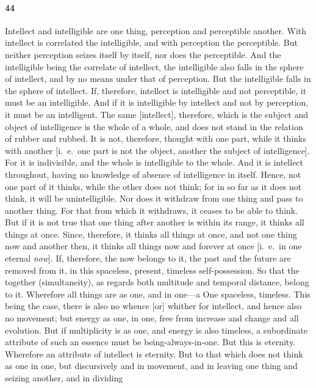 \documentclass[12pt]{article}
\begin{document}
\paragraph{44} Intellect and intelligible are one thing, perception and
perceptible another. With intellect is correlated the intelligible, and with
perception the perceptible. But neither perception seizes itself by itself, nor
does the perceptible. And the intelligible being the correlate of intellect,
the intelligible also falls in the sphere of intellect, and by no means under
that of perception. But the intelligible falls in the sphere of intellect. If,
therefore, intellect is intelligible and not perceptible, it must be an
intelligible. And if it is intelligible by intellect and not by perception, it
must be an intelligent. The same [intellect], therefore, which is the subject
and object of intelligence is the whole of a whole, and does not stand in the
relation of rubber and rubbed. It is not, therefore, thought with one part,
while it thinks with another [i.~e.~one part is not the object, another the
subject of intelligence]. For it is indivisible, and the whole is intelligible
to the whole. And it is intellect throughout, having no knowledge of absence of
intelligence in itself. Hence, not one part of it thinks, while the other does
not think; for in so far as it does not think, it will be unintelligible. Nor
does it withdraw from one thing and pass to another thing. For that from which
it withdraws, it ceases to be able to think. But if it is not true that one
thing after another is within its range, it thinks all things at once. Since,
therefore, it thinks all things at once, and not one thing now and another
then, it thinks all things now and forever at once [i.~e.~in one eternal
\textit{now}]. If, therefore, the now belongs to it, the past and the future
are removed from it, in this spaceless, present, timeless self-possession. So
that the together (simultaneity), as regards both multitude and temporal
distance, belong to it. Wherefore all things are as one, and in one---a One
spaceless, timeless. This being the case, there is also no whence [or] whither
for intellect, and hence also no movement; but energy as one, in one, free from
increase and change and all evolution. But if multiplicity is as one, and
energy is also timeless, a subordinate attribute of such an es\-sence must be
being-always-in-one. But this is eternity. Wherefore an attribute of intellect
is eternity. But to that which does not think as one in one, but discursively
and in movement, and in leaving one thing and seizing another, and in dividing
\end{document}
